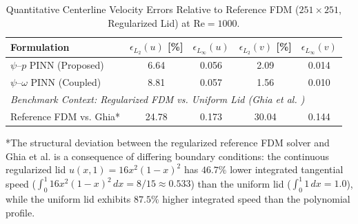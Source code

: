 \begin{table}[htbp]
\centering
\caption{Quantitative Centerline Velocity Errors Relative to Reference FDM ($251 \times 251$, Regularized Lid) at $\mathrm{Re} = 1000$.}
\label{tab:velocity_errors}
\small
\begin{tabular}{lcccc}
\toprule
\textbf{Formulation} & $\epsilon_{L_2}(u)$ [\%] & $\epsilon_{L_\infty}(u)$ & $\epsilon_{L_2}(v)$ [\%] & $\epsilon_{L_\infty}(v)$ \\
\midrule
$\psi\text{--}p$ PINN (Proposed) & 6.64 & 0.056 & 2.09 & 0.014 \\
$\psi\text{--}\omega$ PINN (Coupled) & 8.81 & 0.057 & 1.56 & 0.010 \\
\midrule
\multicolumn{5}{l}{\textit{Benchmark Context: Regularized FDM vs. Uniform Lid (Ghia et al. \cite{ghia1982high})}} \\
Reference FDM vs. Ghia* & 24.78 & 0.173 & 30.04 & 0.144 \\
\bottomrule
\end{tabular}
\vspace{1ex}
\begin{flushleft}
\footnotesize
*The structural deviation between the regularized reference FDM solver and Ghia et al. \cite{ghia1982high} is a consequence of differing boundary conditions: the continuous regularized lid $u(x,1)=16x^2(1-x)^2$ has $46.7\%$ lower integrated tangential speed ($\int_0^1 16x^2(1-x)^2\,dx = 8/15 \approx 0.533$) than the uniform lid ($\int_0^1 1\,dx = 1.0$), while the uniform lid exhibits $87.5\%$ higher integrated speed than the polynomial profile.
\end{flushleft}
\end{table}
